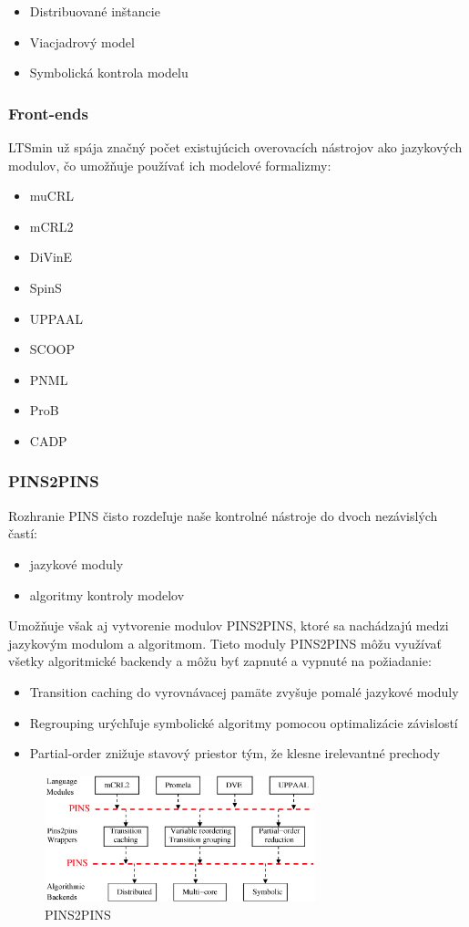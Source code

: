 \begin{itemize}
	\item Distribuované inštancie
	\item Viacjadrový model
	\item Symbolická kontrola modelu
\end{itemize}

\subsubsection{Front-ends}
LTSmin už spája značný počet existujúcich overovacích nástrojov ako jazykových modulov, 
čo umožňuje používať ich modelové formalizmy:

\begin{itemize}
	\item muCRL
	\item mCRL2
	\item DiVinE
	\item SpinS
	\item UPPAAL
	\item SCOOP
	\item PNML
	\item ProB
	\item CADP
\end{itemize}

\subsubsection{PINS2PINS}
Rozhranie PINS čisto rozdeľuje naše kontrolné nástroje do dvoch nezávislých častí: 
\begin{itemize}
	\item jazykové moduly
	\item algoritmy kontroly modelov
\end{itemize}
Umožňuje však aj vytvorenie modulov PINS2PINS, 
ktoré sa nachádzajú medzi jazykovým modulom a algoritmom.
Tieto moduly PINS2PINS môžu využívať všetky algoritmické backendy a 
môžu byť zapnuté a vypnuté na požiadanie:

\begin{itemize}
	\item Transition caching do vyrovnávacej pamäte zvyšuje pomalé jazykové moduly
	\item Regrouping urýchľuje symbolické algoritmy pomocou optimalizácie závislostí
	\item Partial-order znižuje stavový priestor tým, že klesne irelevantné prechody
\end{itemize}

\begin{figure}[ht]
\centerline{\includegraphics[width=0.7\textwidth]{images/pins2pins}}
\caption[PINS2PINS]{PINS2PINS}
\label{obr:pins2pins}
\end{figure}